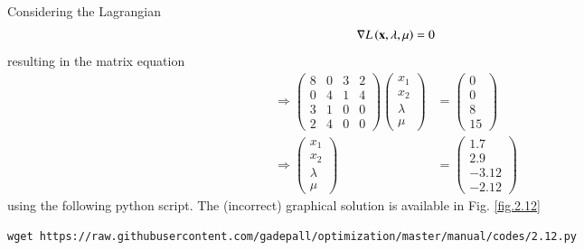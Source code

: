 \documentclass[journal,12pt,twocolumn]{IEEEtran}
\renewcommand\thesection{\arabic{section}}
\begin{document}
\begin{enumerate}[label=\thesection.\arabic*,ref=\thesection.\theenumi]
%
\solution Considering the Lagrangian
%
\begin{align}
 \nabla L\brak{\mbf{x},\lambda, \mu}  %
= 0
\end{align}
%
resulting in the matrix equation
%
\begin{align}
\Rightarrow 
\begin{pmatrix}
8 &0 & 3 & 2\\
0 &4 & 1 & 4 \\
3 & 1 & 0 &0  \\
2 & 4 & 0 & 0
\end{pmatrix}
\begin{pmatrix}
x_1 \\
x_2 \\
\lambda
\\
\mu
\end{pmatrix}
&=
\begin{pmatrix}
0 \\
0 \\
8 \\
15
\end{pmatrix}
\\
\Rightarrow 
\begin{pmatrix}
x_1 \\
x_2 \\
\lambda
\\
\mu
\end{pmatrix}
&= 
\begin{pmatrix}
1.7 \\
 2.9 \\
-3.12 \\
-2.12
\end{pmatrix}
\end{align}
%
using the following python script.  The (incorrect) graphical solution is available in Fig. \ref{fig.2.12}
%	
\begin{lstlisting}
wget https://raw.githubusercontent.com/gadepall/optimization/master/manual/codes/2.12.py
\end{lstlisting}


\end{enumerate}
\end{document}
